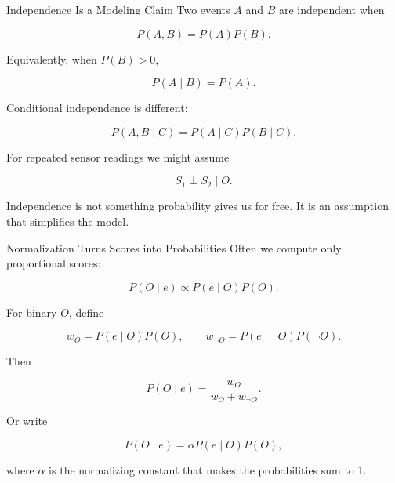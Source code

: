 \documentclass[aspectratio=169,10pt]{beamer}
\begin{document}
\begin{frame}[shrink=10]{Independence Is a Modeling Claim}
  Two events $A$ and $B$ are independent when

  \[
    P(A,B)=P(A)P(B).
  \]

  Equivalently, when $P(B)>0$,

  \[
    P(A\mid B)=P(A).
  \]

  Conditional independence is different:

  \[
    P(A,B\mid C)=P(A\mid C)P(B\mid C).
  \]

  For repeated sensor readings we might assume

  \[
    S_1 \perp S_2 \mid O.
  \]

  \begin{keyidea}
    Independence is not something probability gives us for free. It is an assumption that simplifies the model.
  \end{keyidea}
\end{frame}

\begin{frame}[shrink=10]{Normalization Turns Scores into Probabilities}
  Often we compute only proportional scores:

  \[
    P(O\mid e)\propto P(e\mid O)P(O).
  \]

  For binary $O$, define

  \[
    w_O=P(e\mid O)P(O),
    \qquad
    w_{\neg O}=P(e\mid \neg O)P(\neg O).
  \]

  Then

  \[
    P(O\mid e)=\frac{w_O}{w_O+w_{\neg O}}.
  \]

  Or write

  \[
    P(O\mid e)=\alpha P(e\mid O)P(O),
  \]

  where $\alpha$ is the normalizing constant that makes the probabilities sum to 1.
\end{frame}
\end{document}

